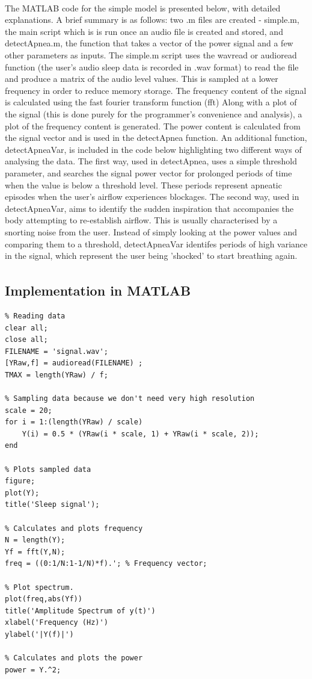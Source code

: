  The MATLAB\textsuperscript{\textregistered{}} code for the simple model is presented below, with detailed explanations. A brief summary is as follows: two .m files are created - simple.m, the main script which is is run once an audio file is created and stored, and detectApnea.m, the function that takes a vector of the power signal and a few other parameters as inputs. The simple.m script uses the wavread or audioread function (the user's audio sleep data is recorded in .wav format) to read the file and produce a matrix of the audio level values. This is sampled at a lower frequency in order to reduce memory storage. The frequency content of the signal is calculated using the fast fourier transform function (fft) Along with a plot of the signal (this is done purely for the programmer's convenience and analysis), a plot of the frequency content is generated. The power content is calculated from the signal vector and is used in the detectApnea function. An additional function, detectApneaVar, is included in the code below highlighting two different ways of analysing the data. The first way, used in detectApnea, uses a simple threshold parameter, and searches the signal power vector for prolonged periods of time when the value is below a threshold level. These periods represent apneatic episodes when the user's airflow experiences blockages. The second way, used in detectApneaVar, aims to identify the sudden inspiration that accompanies the body attempting to re-establish airflow. This is usually characterised by a snorting noise from the user. Instead of simply looking at the power values and comparing them to a threshold, detectApneaVar identifes periods of high variance in the signal, which represent the user being 'shocked' to start breathing again.

\subsection{Implementation in MATLAB\textsuperscript{\textregistered{}}}

\begin{lstlisting} 
% Reading data
clear all;
close all;
FILENAME = 'signal.wav';
[YRaw,f] = audioread(FILENAME) ;
TMAX = length(YRaw) / f;

% Sampling data because we don't need very high resolution
scale = 20;
for i = 1:(length(YRaw) / scale)
    Y(i) = 0.5 * (YRaw(i * scale, 1) + YRaw(i * scale, 2));
end

% Plots sampled data
figure;
plot(Y);
title('Sleep signal');

% Calculates and plots frequency
N = length(Y);
Yf = fft(Y,N);
freq = ((0:1/N:1-1/N)*f).'; % Frequency vector;

% Plot spectrum.
plot(freq,abs(Yf)) 
title('Amplitude Spectrum of y(t)')
xlabel('Frequency (Hz)')
ylabel('|Y(f)|')

% Calculates and plots the power
power = Y.^2;
\end{lstlisting}

